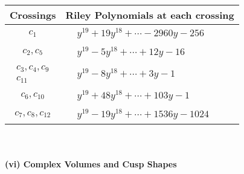 \documentclass[1p]{elsarticle_modified}
\theoremstyle{definition}
\begin{document}
\begin{tabular}{m{50pt}|m{274pt}}
Crossings & \hspace{64pt}Riley Polynomials at each crossing \\
\hline $$\begin{aligned}c_{1}\end{aligned}$$&$\begin{aligned}
&y^{19}+19 y^{18}+\cdots-2960 y-256
\end{aligned}$\\
\hline $$\begin{aligned}c_{2},c_{5}\end{aligned}$$&$\begin{aligned}
&y^{19}-5 y^{18}+\cdots+12 y-16
\end{aligned}$\\
\hline $$\begin{aligned}c_{3},c_{4},c_{9}\\c_{11}\end{aligned}$$&$\begin{aligned}
&y^{19}-8 y^{18}+\cdots+3 y-1
\end{aligned}$\\
\hline $$\begin{aligned}c_{6},c_{10}\end{aligned}$$&$\begin{aligned}
&y^{19}+48 y^{18}+\cdots+103 y-1
\end{aligned}$\\
\hline $$\begin{aligned}c_{7},c_{8},c_{12}\end{aligned}$$&$\begin{aligned}
&y^{19}-19 y^{18}+\cdots+1536 y-1024
\end{aligned}$\\
\hline
\end{tabular}\\~\\
\newpage\flushleft \textbf{(vi) Complex Volumes and Cusp Shapes}
\end{document}
